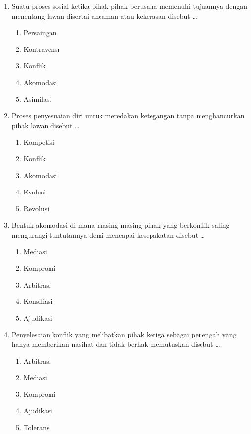 \documentclass[12pt,a4paper]{article}
\begin{document}
\begin{enumerate}[leftmargin=*]
\item Suatu proses sosial ketika pihak-pihak berusaha memenuhi tujuannya dengan menentang lawan disertai ancaman atau kekerasan disebut \dots
    \begin{enumerate}[label=\alph*.]
        \item Persaingan
        \item Kontravensi
        \item Konflik
        \item Akomodasi
        \item Asimilasi
    \end{enumerate}

\item Proses penyesuaian diri untuk meredakan ketegangan tanpa menghancurkan pihak lawan disebut \dots
    \begin{enumerate}[label=\alph*.]
        \item Kompetisi
        \item Konflik
        \item Akomodasi
        \item Evolusi
        \item Revolusi
    \end{enumerate}

\item Bentuk akomodasi di mana masing-masing pihak yang berkonflik saling mengurangi tuntutannya demi mencapai kesepakatan disebut \dots
    \begin{enumerate}[label=\alph*.]
        \item Mediasi
        \item Kompromi
        \item Arbitrasi
        \item Konsiliasi
        \item Ajudikasi
    \end{enumerate}

\item Penyelesaian konflik yang melibatkan pihak ketiga sebagai penengah yang hanya memberikan nasihat dan tidak berhak memutuskan disebut \dots
    \begin{enumerate}[label=\alph*.]
        \item Arbitrasi
        \item Mediasi
        \item Kompromi
        \item Ajudikasi
        \item Toleransi
    \end{enumerate}


\end{enumerate}
\end{document}
